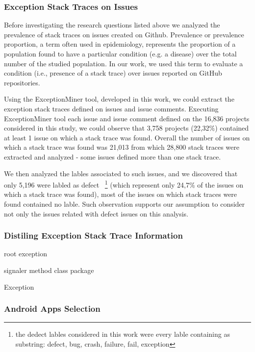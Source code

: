 \documentclass[conference]{IEEEtran}
\begin{document}
\subsubsection{Exception Stack Traces on Issues}

Before investigating the research questions listed above we analyzed the prevalence of stack traces 
on issues created on Github. Prevalence or prevalence proportion, a term often used in epidemiology,
represents the proportion of a population found to have a particular condition
(e.g. a disease) over the total number of the studied population. In our work, we used
this term to evaluate a condition (i.e., presence of a stack trace) over issues
reported on GitHub repositories.

Using the ExceptionMiner tool, developed in this work, we could extract the exception stack traces defined on issues and issue comments. Executing ExceptionMiner tool each issue and issue comment defined on the 16,836 projects considered in this study, we could observe that 3,758 projects (22,32\%) contained at least 1 issue on which a stack trace was found. Overall the number of issues on which a stack trace was found was 21,013 from which 28,800 stack traces were extracted and analyzed - some issues defined more than one stack trace.

We then analyzed the lables associated to such issues, and we discovered that only 5,196 were labled as defect ~\footnote{the dedect lables considered in this work were every lable containing as substring: defect, bug, crash, failure, fail, exception} (which represent only 24,7\% of the issues on which a stack trace was found), most of the issues on which stack traces were found contained no lable. Such observation supports our assumption to consider not only the issues related with defect issues on this analysis.

\subsubsection{Distiling Exception Stack Trace Information}

\- root exception

\- signaler
\- method
\- class
\- package

\- Exception



\subsubsection{Android Apps Selection}
\label{sec:android}
\end{document}
